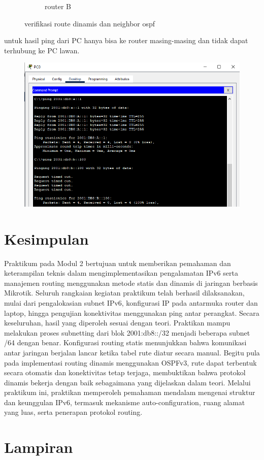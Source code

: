 \begin{figure}[H]
\begin{subfigure}[b]{0.3\linewidth}
      \caption{router B}
    \end{subfigure}
    \caption{verifikasi route dinamis dan neighbor ospf}
\end{figure}
untuk hasil ping dari PC hanya bisa ke router masing-masing dan tidak dapat terhubung ke PC lawan.
\begin{figure}[H]
    \centering
    \includegraphics[width=0.5\linewidth]{image/hasil.png}
    \label{fig:inirujukan}
\end{figure}

\section{Kesimpulan}
Praktikum pada Modul 2 bertujuan untuk memberikan pemahaman dan keterampilan teknis dalam mengimplementasikan pengalamatan IPv6 serta manajemen routing menggunakan metode statis dan dinamis di jaringan berbasis Mikrotik. Seluruh rangkaian kegiatan praktikum telah berhasil dilaksanakan, mulai dari pengalokasian subnet IPv6, konfigurasi IP pada antarmuka router dan laptop, hingga pengujian konektivitas menggunakan ping antar perangkat. Secara keseluruhan, hasil yang diperoleh sesuai dengan teori. Praktikan mampu melakukan proses subnetting dari blok 2001:db8::/32 menjadi beberapa subnet /64 dengan benar. Konfigurasi routing statis menunjukkan bahwa komunikasi antar jaringan berjalan lancar ketika tabel rute diatur secara manual. Begitu pula pada implementasi routing dinamis menggunakan OSPFv3, rute dapat terbentuk secara otomatis dan konektivitas tetap terjaga, membuktikan bahwa protokol dinamis bekerja dengan baik sebagaimana yang dijelaskan dalam teori. Melalui praktikum ini, praktikan memperoleh pemahaman mendalam mengenai struktur dan keunggulan IPv6, termasuk mekanisme auto-configuration, ruang alamat yang luas, serta penerapan protokol routing.

\section{Lampiran}
